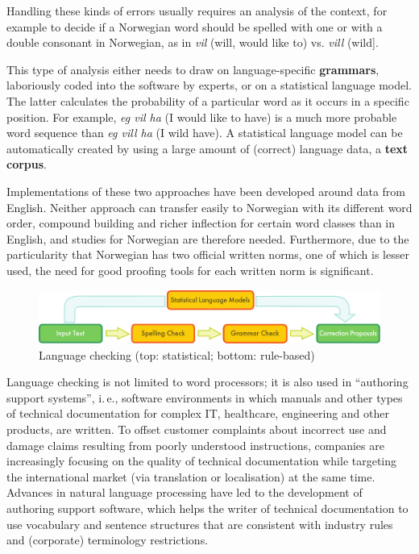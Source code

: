 \begin{multicols}{2}
Handling these kinds of errors usually requires an analysis of the context, for example to decide if a Norwegian word should be spelled with one or with a double consonant in Norwegian, as in \textit{vil} (will, would like to) vs. \textit{vill} (wild].

This type of analysis either needs to draw on language-specific \textbf{grammars}, laboriously coded into the software by experts, or on a statistical language model. The latter calculates the probability of a particular word as it occurs in a specific position. For example, \textit{eg vil ha} (I would like to have) is a much more probable word sequence than \textit{eg vill ha} (I wild have). A statistical language model can be automatically created by using a large amount of (correct) language data, a \textbf{text corpus}.

Implementations of these two approaches have been developed around data from English. Neither approach can transfer easily to Norwegian with its different word order, compound building and richer inflection for certain word classes than in English, and studies for Norwegian are therefore needed. Furthermore, due to the particularity that Norwegian has two official written norms, one of which is lesser used, the need for good proofing tools for each written norm is significant. 

\begin{figure}[htb]
  \center
  \includegraphics[width=\textwidth]{../_media/english/language_checking}
  \caption{Language checking (top: statistical; bottom: rule-based)}
  \label{fig:langcheckingaarch_en}
\end{figure}

Language checking is not limited to word processors; it is also used in “authoring support systems”, i.\,e., software environments in which manuals and other types of technical documentation for complex IT, healthcare, engineering and other products, are written. To offset customer complaints about incorrect use and damage claims resulting from poorly understood instructions, companies are increasingly focusing on the quality of technical documentation while targeting the international market (via translation or localisation) at the same time. Advances in natural language processing have led to the development of authoring support software, which helps the writer of technical documentation to use vocabulary and sentence structures that are consistent with industry rules and (corporate) terminology restrictions.


\end{multicols}
